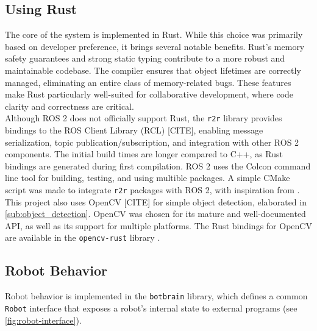 \subsection{Using Rust}
The core of the system is implemented in Rust. While this choice was primarily based on developer preference, it brings several notable benefits. 
Rust's memory safety guarantees and strong static typing contribute to a more robust and maintainable codebase. The compiler ensures that object lifetimes are correctly managed, eliminating an entire class of memory-related bugs. These features make Rust particularly well-suited for collaborative development, where code clarity and correctness are critical. \\

Although ROS 2 does not officially support Rust, the \texttt{r2r} library \cite{r2r} provides bindings to the ROS Client Library (RCL) {\color{red} [CITE]}, enabling message serialization, topic publication/subscription, and integration with other ROS 2 components. The initial build times are longer compared to C++, as Rust bindings are generated during first compilation. ROS 2 uses the Colcon command line tool \cite{colcon} for building, testing, and using multible packages. A simple CMake script was made to integrate \texttt{r2r} packages with ROS 2, with inspiration from \cite{r2r-minimal-node}. \\

This project also uses OpenCV {\color{red} [CITE]} for simple object detection, elaborated in \cref{sub:object_detection}. OpenCV was chosen for its mature and well-documented API, as well as its support for multiple platforms. The Rust bindings for OpenCV are available in the \texttt{opencv-rust} library \cite{opencv-rust}.


\subsection{Robot Behavior}
Robot behavior is implemented in the \texttt{botbrain} library, which defines a common \texttt{Robot} interface that exposes a robot’s internal state to external programs (see \cref{fig:robot-interface}).


